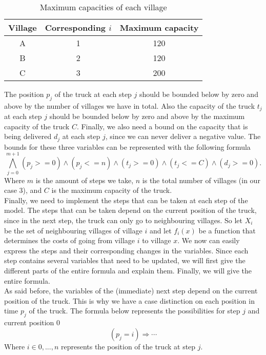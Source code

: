 \documentclass[a4paper]{article}
\begin{document}
\begin{table}[H]
\centering
\caption{Maximum capacities of each village}
\label{my-label}
\begin{tabular}{c|c|c}
\textbf{Village} & \textbf{Corresponding $i$} & \textbf{Maximum capacity} \\ \hline
A	&	1	&	120\\ \hline
B	&	2	&	120\\ \hline
C	&	3	&	200
\end{tabular}
\end{table}

	The position $p_j$ of the truck at each step $j$ should be bounded below by zero and above by the number of villages we have in total. Also the capacity of the truck $t_j$ at each step $j$ should be bounded below by zero and above by the maximum capacity of the truck $C$. Finally, we also need a bound on the capacity that is being delivered $d_j$ at each step $j$, since we can never deliver a negative value. The bounds for these three variables can be represented with the following formula
	\[ \bigwedge_{j=0}^{m+1} (p_j >= 0) \wedge (p_j <= n) \wedge (t_j >= 0) \wedge (t_j <= C) \wedge (d_j >= 0).\]
	Where $m$ is the amount of steps we take, $n$ is the total number of villages (in our case 3), and $C$ is the maximum capacity of the truck.\\

Finally, we need to implement the steps that can be taken at each step of the model. The steps that can be taken depend on the current position of the truck, since in the next step, the truck can only go to neighbouring villages. So let $X_i$ be the set of neighbouring villages of village $i$ and let $f_i(x)$ be a function that determines the costs of going from village $i$ to village $x$. We now can easily express the steps and their corresponding changes in the variables. Since each step contains several variables that need to be updated, we will first give the different parts of the entire formula and explain them. Finally, we will give the entire formula.\\

As said before, the variables of the (immediate) next step depend on the current position of the truck. This is why we have a case distinction on each position in time $p_j$ of the truck. The formula below represents the possibilities for step $j$ and current position $0$
\[ (p_j = i) \Rightarrow \cdots \]
Where $i \in {0,...,n}$ represents the position of the truck at step $j$.\\
\end{document}
